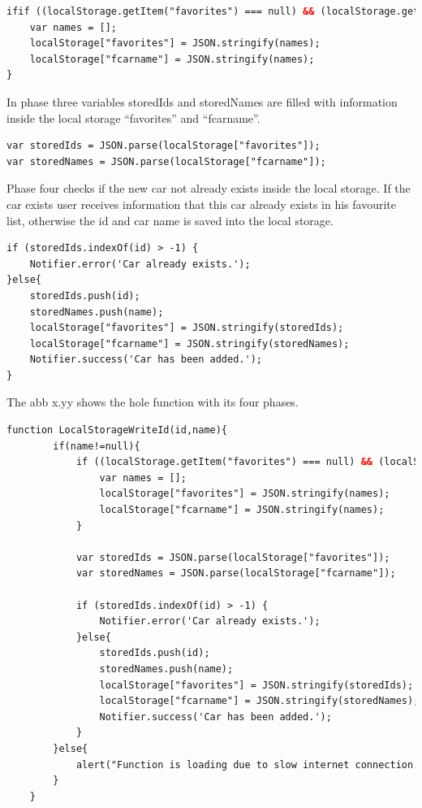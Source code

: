 \begin{lstlisting}[language=html, caption= 
start timer function,captionpos=b]
ifif ((localStorage.getItem("favorites") === null) && (localStorage.getItem("fcarname") == null)) {
	var names = [];
	localStorage["favorites"] = JSON.stringify(names);
	localStorage["fcarname"] = JSON.stringify(names);
}
\end{lstlisting}

In phase three variables storedIds and storedNames are filled with information inside the local storage “favorites” and “fcarname”.
\\

\begin{lstlisting}[language=html, caption= 
start timer function,captionpos=b]
var storedIds = JSON.parse(localStorage["favorites"]);
var storedNames = JSON.parse(localStorage["fcarname"]);
\end{lstlisting}

Phase four checks if the new car not already exists inside the local storage. If the car exists user receives information that this car already exists in his favourite list, otherwise the id and car name is saved into the local storage.
\\

\begin{lstlisting}[language=html, caption= 
start timer function,captionpos=b]
if (storedIds.indexOf(id) > -1) {
	Notifier.error('Car already exists.');
}else{
	storedIds.push(id);
	storedNames.push(name);
	localStorage["favorites"] = JSON.stringify(storedIds);
	localStorage["fcarname"] = JSON.stringify(storedNames);
	Notifier.success('Car has been added.');
}
\end{lstlisting}

The abb x.yy shows the hole function with its four phases.
\begin{lstlisting}[language=html, caption= 
start timer function,captionpos=b]
function LocalStorageWriteId(id,name){
		if(name!=null){
			if ((localStorage.getItem("favorites") === null) && (localStorage.getItem("fcarname") == null)) {
				var names = [];
				localStorage["favorites"] = JSON.stringify(names);
				localStorage["fcarname"] = JSON.stringify(names);
			}
			
			var storedIds = JSON.parse(localStorage["favorites"]);
			var storedNames = JSON.parse(localStorage["fcarname"]);
		
			if (storedIds.indexOf(id) > -1) {
				Notifier.error('Car already exists.');
			}else{
				storedIds.push(id);
				storedNames.push(name);
				localStorage["favorites"] = JSON.stringify(storedIds);
				localStorage["fcarname"] = JSON.stringify(storedNames);
				Notifier.success('Car has been added.');
			}
		}else{
			alert("Function is loading due to slow internet connection.");
		}
    }
\end{lstlisting}

